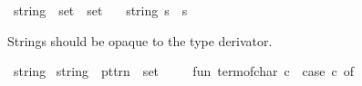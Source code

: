 \begin{isabellebody}
\ string\ {\isacharcolon}{\kern0pt}{\isacharcolon}{\kern0pt}\ {\isacartoucheopen}set\ {\isasymRightarrow}\ set{\isacartoucheclose}\isanewline
\ \ \ {\isachardoublequoteopen}string\ s\ {\isasymequiv}\ s{\isachardoublequoteclose}\ %
%
\begin{isamarkuptext}%
Strings should be opaque to the type derivator.%
\end{isamarkuptext}\isamarkuptrue%
\isamarkupfalse%
\ {\isachardoublequoteopen}string{\isachardoublequoteclose}\isanewline
\isanewline
{}\isamarkupfalse%
\ {\isachardoublequoteopen}{\isacharunderscore}{\kern0pt}string{\isachardoublequoteclose}\ {\isacharcolon}{\kern0pt}{\isacharcolon}{\kern0pt}\ {\isacartoucheopen}pttrn\ {\isasymRightarrow}\ set{\isacartoucheclose}\ {\isacharparenleft}{\kern0pt}{\isachardoublequoteopen}{\isacharat}{\kern0pt}{\isacharunderscore}{\kern0pt}{\isachardoublequoteclose}{\isacharparenright}{\kern0pt}\isanewline
%
\isadelimML
\isanewline
%
\endisadelimML
%
\isatagML
{}\isamarkupfalse%
\ {\isacartoucheopen}\isanewline
\ \ fun\ term{\isacharunderscore}{\kern0pt}of{\isacharunderscore}{\kern0pt}char\ c\ {\isacharequal}{\kern0pt}\ case\ c\ of\isanewline
\ \ \ \ \ \ {\isacharhash}{\kern0pt}{\isachardoublequote}{\kern0pt}{}{\isachardoublequote}{\kern0pt}\ {\isacharequal}{\kern0pt}{\isachargreater}{\kern0pt}\ \ {\isacharbar}{\kern0pt}\ {\isacharhash}{\kern0pt}{\isachardoublequote}{\kern0pt}{}{\isachardoublequote}{\kern0pt}\ {\isacharequal}{\kern0pt}{\isachargreater}{\kern0pt}\ \ {\isacharbar}{\kern0pt}\ {\isacharhash}{\kern0pt}{\isachardoublequote}{\kern0pt}{}{\isachardoublequote}{\kern0pt}\ {\isacharequal}{\kern0pt}{\isachargreater}{\kern0pt}\ \ {\isacharbar}{\kern0pt}\ {\isacharhash}{\kern0pt}{\isachardoublequote}{\kern0pt}{}{\isachardoublequote}{\kern0pt}\ {\isacharequal}{\kern0pt}{\isachargreater}{\kern0pt}\ \isanewline

\end{isabellebody}
